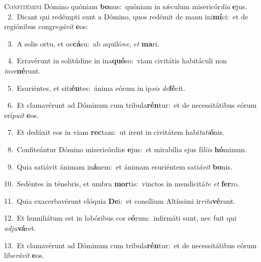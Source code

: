 \lettrine{\initial\textcolor{\initialcolor}{C}}{onfitémini} Dómino quóniam \textbf{bo}\-nus:~\star quóniam in sǽculum misericór\-\textit{di}\-\textit{a} \textbf{e}\-jus.\\
{\numbfont\textcolor{\numbcolor}{~2.}}~Dicant qui redémpti sunt a Dómino, quos redémit de manu ini\-\textbf{mí}\-ci:~\star et de regiónibus congre\-\textit{gá}\-\textit{vit} \textbf{e}\-os:\par
{\numbfont\textcolor{\numbcolor}{~3.}}~A solis ortu, et oc\-\textbf{cá}\-su:~\star ab aquiló\-\textit{ne}\-, \textit{et} \textbf{ma}\-ri.\par
{\numbfont\textcolor{\numbcolor}{~4.}}~Erravérunt in solitúdine in ina\-\textbf{quó}\-so:~\star viam civitátis habitáculi non \textit{in}\-\textit{ve}\textbf{né}runt.\par
{\numbfont\textcolor{\numbcolor}{~5.}}~Esuriéntes, et siti\-\textbf{én}\-tes:~\star ánima eórum in ip\textit{sis} \textit{de}\-\textbf{fé}cit.\par
{\numbfont\textcolor{\numbcolor}{~6.}}~Et clamavérunt ad Dóminum cum tribula\-\textbf{rén}\-tur:~\star et de necessitátibus eórum erí\-\textit{pu}\-\textit{it} \textbf{e}\-os.\par
{\numbfont\textcolor{\numbcolor}{~7.}}~Et dedúxit eos in viam \textbf{rec}\-tam:~\star ut irent in civitátem habi\-\textit{ta}\-\textit{ti}\textbf{ó}nis.\par
{\numbfont\textcolor{\numbcolor}{~8.}}~Confiteántur Dómino misericórdiæ \textbf{e}\-jus:~\star et mirabília ejus fí\-\textit{li}\-\textit{is} \textbf{hó}\-minum.\par
{\numbfont\textcolor{\numbcolor}{~9.}}~Quia satiávit ánimam in\-\textbf{á}\-nem:~\star et ánimam esuriéntem sati\-\textit{á}\-\textit{vit} \textbf{bo}\-nis.\par
{\numbfont\textcolor{\numbcolor}{10.}}~Sedéntes in ténebris, et umbra \textbf{mor}\-tis:~\star vinctos in mendicitá\textit{te} \textit{et} \textbf{fer}\-ro.\par
{\numbfont\textcolor{\numbcolor}{11.}}~Quia exacerbavérunt elóquia \textbf{De}\-i:~\star et consílium Altíssimi ir\-\textit{ri}\-\textit{ta}\textbf{vé}runt.\par
{\numbfont\textcolor{\numbcolor}{12.}}~Et humiliátum est in labóribus cor e\-\textbf{ó}\-rum:~\star infirmáti sunt, nec fuit qui \textit{ad}\-\textit{ju}\textbf{vá}ret.\par
{\numbfont\textcolor{\numbcolor}{13.}}~Et clamavérunt ad Dóminum cum tribula\-\textbf{rén}\-tur:~\star et de necessitátibus eórum libe\-\textit{rá}\-\textit{vit} \textbf{e}\-os.\par

